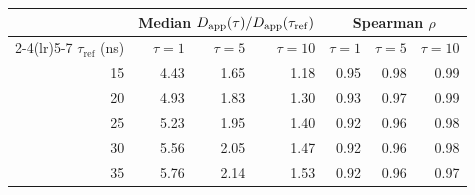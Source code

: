 \begin{tabular}{rrrrrrr}
\toprule
 & \multicolumn{3}{c}{Median $D_{\mathrm{app}}(\tau)/D_{\mathrm{app}}(\tau_{\mathrm{ref}})$} & \multicolumn{3}{c}{Spearman $\rho$} \\
\cmidrule(lr){2-4}\cmidrule(lr){5-7}
$\tau_{\mathrm{ref}}$ (ns) & $\tau=1$ & $\tau=5$ & $\tau=10$ & $\tau=1$ & $\tau=5$ & $\tau=10$ \\
\midrule
15 & 4.43 & 1.65 & 1.18 & 0.95 & 0.98 & 0.99 \\
20 & 4.93 & 1.83 & 1.30 & 0.93 & 0.97 & 0.99 \\
25 & 5.23 & 1.95 & 1.40 & 0.92 & 0.96 & 0.98 \\
30 & 5.56 & 2.05 & 1.47 & 0.92 & 0.96 & 0.98 \\
35 & 5.76 & 2.14 & 1.53 & 0.92 & 0.96 & 0.97 \\
\bottomrule
\end{tabular}
